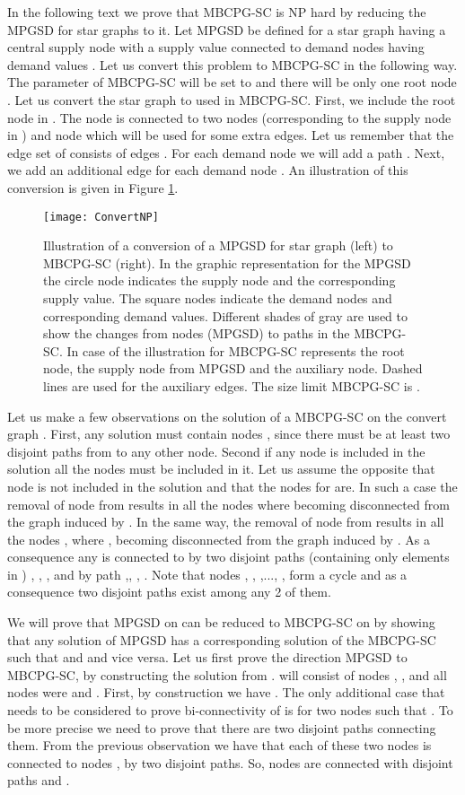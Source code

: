 In the following text we prove that MBCPG-SC is NP hard by reducing the MPGSD for star graphs to it. Let MPGSD be defined  for a star graph  having a central supply node  with a supply value  connected to  demand nodes  having demand values . Let us convert this problem to MBCPG-SC in the following way. The parameter   of MBCPG-SC will be set to  and there will be only one root node . Let us convert the star graph  to   used in MBCPG-SC. First, we include the root node  in . The node  is connected to two nodes  (corresponding to the supply node in ) and node  which will be used for some extra edges.  Let us remember that the edge set  of  consists of edges . For each demand node  we will add a path . Next, we add an additional edge   for each demand node . An illustration of this conversion is given in Figure \ref{fig:ConvertNP}.
\begin{figure}[tcb]
\centering
\texttt{[image: ConvertNP]}
\caption{Illustration of a conversion of a MPGSD for star graph (left) to MBCPG-SC (right). In the graphic representation for the MPGSD the circle node indicates the supply node and the corresponding supply value. The square nodes indicate the demand nodes and corresponding demand values. Different shades of gray are used to show the changes from nodes (MPGSD) to paths in the MBCPG-SC. In case of the illustration for MBCPG-SC  represents the root node,  the supply node from MPGSD and  the auxiliary node. Dashed lines are used for the auxiliary edges. The size limit MBCPG-SC is .}
\label{fig:ConvertNP}
\end{figure} 

Let us make a few observations on the solution of a MBCPG-SC on the convert graph . First, any solution must contain nodes ,  since there must be at least two disjoint paths from  to any other node. Second if any node  is included in the solution  all the nodes  must be included in it. Let us assume the opposite that node  is not included in the solution and that  the nodes  for  are. In such a case the removal of node  from   results in all the nodes  where   becoming disconnected from  the graph induced by . In the same way, the removal of node  from   results in all the nodes , where , becoming disconnected from the graph induced by .  As a consequence any  is connected to  by two disjoint paths (containing only elements in )  ,  , ,  and by path ,, , . Note that nodes , , ,...,  ,  form a cycle and as a consequence two disjoint paths exist among any 2 of them.


We will prove that MPGSD on  can be reduced to MBCPG-SC on  by showing that any solution  of MPGSD has a corresponding solution  of the MBCPG-SC such that  and and vice versa. Let us first prove  the direction MPGSD to MBCPG-SC, by constructing the solution  from .   will consist of nodes , ,   and all nodes  were  and . First, by construction we have  .  The only additional case that needs to be considered to prove bi-connectivity of   is for two nodes   such that . To be more precise we need to prove that there are two disjoint paths connecting them.   From the previous observation we have that each of these two nodes is connected to nodes ,   by two disjoint paths. So, nodes   are connected with disjoint paths  and . 


